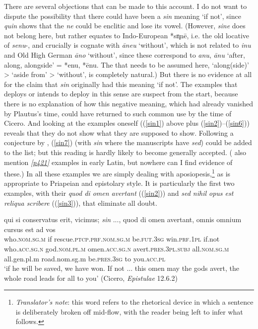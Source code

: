 There are several objections that can be made to this account. I do not want to dispute the possibility that there could have been a \emph{sin} meaning `if not', since \emph{quin} shows that the  \emph{ne} could be enclitic and lose its vowel. (However, \emph{sine} does not belong here, but rather equates to Indo-European *sn̥nē, i.e. the old locative of \emph{senu}-, and crucially is cognate with  \emph{āneu} `without', which is not related to  \emph{inu} and Old High German \emph{āno} `without', since these correspond to  \emph{anu}, \emph{ānu} `after, along, alongside' =  *enu, *ēnu. The  that needs to be assumed here, `along(side)' > `aside from' > `without', is completely natural.) But there is no evidence at all for the claim that \emph{sin} originally had this meaning `if not'. The examples that \citet{Ribbeck1869} deploys or intends to deploy in this sense are suspect from the start, because there is no explanation of how this negative meaning, which had already vanished by Plautus's time, could have returned to such common use by the time of Cicero. And looking at the examples oneself ((\ref{sin1}) above plus (\ref{sin2})--(\ref{sin6})) reveals that they do not show what they are supposed to show. Following a conjecture by \citet[347]{Vahlen1879}, (\ref{sin7}) (with \emph{sin} where the manuscripts have \emph{sed}) could be added to the list; but this reading is hardly likely to become generally accepted. (\citet{StolzSchmalz1890} also mention \hyperlink{p421}{\emph{[p421]}} examples in early Latin, but nowhere can I find evidence of these.) In all these examples we are simply dealing with aposiopesis,\footnote{\emph{Translator's note}: this word refers to the rhetorical device in which a sentence is deliberately broken off mid-flow, with the reader being left to infer what follows.} as is appropriate to Priapeian and epistolary style. It is particularly the first two examples, with their \emph{quod di omen avertant} ((\ref{sin2})) and \emph{sed nihil opus est reliqua scribere} ((\ref{sin3})), that eliminate all doubt.

\begin{exe}
\ex
\gll qui si conservatus erit, vicimus; \emph{sin} ..., quod di omen avertant, omnis omnium cursus est ad vos\\
who.\textsc{nom.sg.m} if rescue.\textsc{ptcp.prf.nom.sg.m} be.\textsc{fut.3sg} win.\textsc{prf.1pl} if.not ~ who.\textsc{acc.sg.n} god.\textsc{nom.pl.m} omen.\textsc{acc.sg.n} avert.\textsc{pres.3pl.subj} all.\textsc{nom.sg.m} all.{gen.pl.m} road.{nom.sg.m} be.\textsc{pres.3sg} to you.\textsc{acc.pl}\\
\trans `if he will be saved, we have won. If not ... this omen may the gods avert, the whole road leads for all to you' (Cicero, \textit{Epistulae} 12.6.2)
\label{sin2}
\end{exe}

